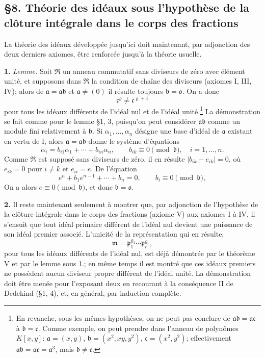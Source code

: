 \providecommand{\mR}{\mathfrak{R}}
\providecommand{\ma}{\mathfrak{a}}
\providecommand{\mb}{\mathfrak{b}}
\providecommand{\mc}{\mathfrak{c}}
\providecommand{\mm}{\mathfrak{m}}
\providecommand{\mn}{\mathfrak{n}}
\providecommand{\mo}{\mathfrak{o}}
\providecommand{\mpideal}{\mathfrak{p}}
\providecommand{\mq}{\mathfrak{q}}
\providecommand{\mt}{\mathfrak{t}}

\subsection*{\S{}8. Théorie des idéaux sous l'hypothèse de la clôture intégrale dans le corps des fractions}

La théorie des idéaux développée jusqu'ici doit maintenant, par adjonction des deux derniers axiomes, être renforcée jusqu'à la théorie usuelle.

\textbf{1.} \emph{Lemme.} Soit $\mR$ un anneau commutatif sans diviseurs de zéro avec élément unité, et supposons dans $\mR$ la condition de chaîne des diviseurs (axiomes I, III, IV); alors de $\ma=\ma\mb$ et $\ma\ne(0)$ il résulte toujours $\mb=\mo$. On a donc
\[
        \mc^\varrho\ne\mc^{\varrho+1}
\]
pour tous les idéaux différents de l'idéal nul et de l'idéal unité.\footnote{En revanche, sous les mêmes hypothèses, on ne peut pas conclure de $\ma\mb=\ma\mc$ à $\mb=\mc$. Comme exemple, on peut prendre dans l'anneau de polynômes $K[x,y]$: $\ma=(x,y)$, $\mb=(x^2,xy,y^2)$, $\mc=(x^2,y^2)$; effectivement $\ma\mb=\ma\mc=\ma^3$, mais $\mb\ne\mc$.} La démonstration se fait comme pour le lemme \S{}1, 3, puisqu'on peut considérer $\ma\mb$ comme un module fini relativement à $\mb$. Si $\alpha_1,\ldots,\alpha_n$ désigne une base d'idéal de $\ma$ existant en vertu de I, alors $\ma=\ma\mb$ donne le système d'équations
\[
        \alpha_i=b_{i1}\alpha_1+\cdots+b_{in}\alpha_n,
        \qquad b_{ik}\equiv0\pmod{\mb},\quad i=1,\ldots,n.
\]
Comme $\mR$ est supposé sans diviseurs de zéro, il en résulte $|b_{ik}-e_{ik}|=0$, où $e_{ik}=0$ pour $i\ne k$ et $e_{ii}=e$. De l'équation
\[
        e^n+b_1e^{n-1}+\cdots+b_n=0,
        \qquad b_i\equiv0\pmod{\mb},
\]
On a alors $e\equiv0\pmod{\mb}$, et donc $\mb=\mo$.

\textbf{2.} Il reste maintenant seulement à montrer que, par adjonction de l'hypothèse de la clôture intégrale dans le corps des fractions (axiome V) aux axiomes I à IV, il s'ensuit que tout idéal primaire différent de l'idéal nul devient une puissance de son idéal premier associé. L'unicité de la représentation qui en résulte,
\[
        \mm=\mpideal_1^{\varrho_1}\cdots\mpideal_r^{\varrho_r},
\]
pour tous les idéaux différents de l'idéal nul, est déjà démontrée par le théorème V et par le lemme sous 1.; en même temps il est montré que ces idéaux premiers ne possèdent aucun diviseur propre différent de l'idéal unité. La démonstration doit être menée pour l'exposant deux en recourant à la conséquence II de Dedekind (\S{}1, 4), et, en général, par induction complète.

